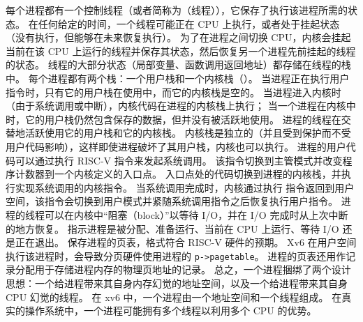 每个进程都有一个控制线程（或者简称为（线程）），它保存了执行该进程所需的状态。
在任何给定的时间，一个线程可能正在 CPU 上执行，或者处于挂起状态（没有执行，但能够在未来恢复执行）。
为了在进程之间切换 CPU，内核会挂起当前在该 CPU 上运行的线程并保存其状态，然后恢复另一个进程先前挂起的线程的状态。
线程的大部分状态（局部变量、函数调用返回地址）都存储在线程的栈中。
每个进程都有两个栈：一个用户栈和一个内核栈（）。
当进程正在执行用户指令时，只有它的用户栈在使用中，而它的内核栈是空的。
当进程进入内核时（由于系统调用或中断），内核代码在进程的内核栈上执行；
当一个进程在内核中时，它的用户栈仍然包含保存的数据，但并没有被活跃地使用。
进程的线程在交替地活跃使用它的用户栈和它的内核栈。
内核栈是独立的（并且受到保护而不受用户代码影响），这样即使进程破坏了其用户栈，内核也可以执行。
进程的用户代码可以通过执行 RISC-V  指令来发起系统调用。
该指令切换到主管模式并改变程序计数器到一个内核定义的入口点。
入口点处的代码切换到进程的内核栈，并执行实现系统调用的内核指令。
当系统调用完成时，内核通过执行  指令返回到用户空间，该指令会切换到用户模式并紧随系统调用指令之后恢复执行用户指令。
进程的线程可以在内核中“阻塞（block）”以等待 I/O，并在 I/O 完成时从上次中断的地方恢复。
 指示进程是被分配、准备运行、当前在 CPU 上运行、等待 I/O 还是正在退出。
 保存进程的页表，格式符合 RISC-V 硬件的预期。
Xv6 在用户空间执行该进程时，会导致分页硬件使用进程的 \lstinline{p->pagetable}。
进程的页表还用作记录分配用于存储进程内存的物理页地址的记录。
总之，一个进程捆绑了两个设计思想：一个给进程带来其自身内存幻觉的地址空间，以及一个给进程带来其自身 CPU 幻觉的线程。
在 xv6 中，一个进程由一个地址空间和一个线程组成。
在真实的操作系统中，一个进程可能拥有多个线程以利用多个 CPU 的优势。
